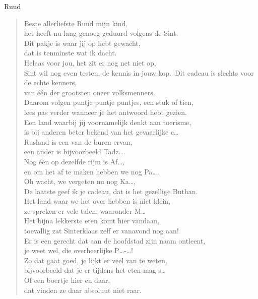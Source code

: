 \documentclass[12pt]{brief}
\date{11 december 2005}
\begin{document}
\begin{letter}{Ruud}

\opening{}


\begin{verse}

Beste allerliefste Ruud mijn kind,\\
het heeft nu lang genoeg geduurd volgens de Sint.\\
Dit pakje is waar jij op hebt gewacht,\\
dat is tenminste wat ik dacht.\\[0.5em]

Helaas voor jou, het zit er nog net niet op,\\
Sint wil nog even testen, de kennis in jouw kop.\
Dit cadeau is slechts voor de echte kenners,\\
van \'e\'en der grootsten onzer volksmenners.\\[0.5em]

Daarom volgen puntje puntje puntjes, een stuk of tien,\\
lees pas verder wanneer je het antwoord hebt gezien.\\[0.5em]

Een land waarbij jij voornamelijk denkt aan toerisme,\\
is bij anderen beter bekend van het gevaarlijke c\ldots\\
Rusland is een van de buren ervan,\\
een ander is bijvoorbeeld Tadz\ldots.\\
Nog \'e\'en op dezelfde rijm is Af\ldots,\\
en om het af te maken hebben we nog Pa\ldots.\\
Oh wacht, we vergeten nu nog Ka\ldots,\\
De laatste geef ik je cadeau, dat is het gezellige Buthan.\\[0.5em]

Het land waar we het over hebben is niet klein,\\
ze spreken er vele talen, waaronder M\ldots\\
Het bijna lekkerste eten komt hier vandaan,\\
toevallig zat Sinterklaas zelf er vanavond nog aan!\\
Er is een gerecht dat aan de hoofdstad zijn naam ontleent,\\
je weet wel, die overheerlijke P\ldots-\ldots!\\[0.5em]

Zo dat gaat goed, je lijkt er veel van te weten,\\
bijvoorbeeld dat je er tijdens het eten mag s\ldots\\
Of een boertje hier en daar,\\
dat vinden ze daar absoluut niet raar.\\[0.5em]


\end{verse}
\end{letter}
\end{document}

